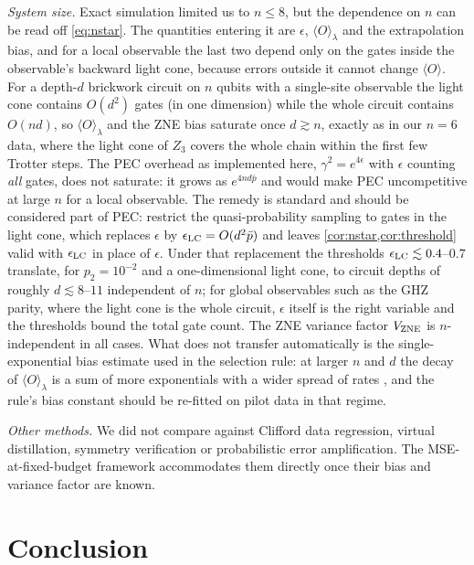 \documentclass[aps,pra,reprint,amsmath,amssymb,nofootinbib,superscriptaddress]{revtex4-2}
\theoremstyle{remark}
\newcommand{\eps}{\epsilon}
\begin{document}
\emph{System size.} Exact simulation limited us to $n\le8$, but the dependence on $n$ can be read off \cref{eq:nstar}. The quantities entering it are $\eps$, $\langle O\rangle_\lambda$ and the extrapolation bias, and for a local observable the last two depend only on the gates inside the observable's backward light cone, because errors outside it cannot change $\langle O\rangle$. For a depth-$d$ brickwork circuit on $n$ qubits with a single-site observable the light cone contains $O(d^2)$ gates (in one dimension) while the whole circuit contains $O(nd)$, so $\langle O\rangle_\lambda$ and the ZNE bias saturate once $d\gtrsim n$, exactly as in our $n=6$ data, where the light cone of $Z_3$ covers the whole chain within the first few Trotter steps. The PEC overhead as implemented here, $\gamma^2=e^{4\eps}$ with $\eps$ counting \emph{all} gates, does not saturate: it grows as $e^{4nd\bar p}$ and would make PEC uncompetitive at large $n$ for a local observable. The remedy is standard and should be considered part of PEC: restrict the quasi-probability sampling to gates in the light cone, which replaces $\eps$ by $\eps_{\rm LC}=O(d^2\bar p)$ and leaves \cref{cor:nstar,cor:threshold} valid with $\eps_{\rm LC}$ in place of $\eps$. Under that replacement the thresholds $\eps_{\rm LC}\lesssim0.4$--$0.7$ translate, for $p_2=10^{-2}$ and a one-dimensional light cone, to circuit depths of roughly $d\lesssim8$--$11$ independent of $n$; for global observables such as the GHZ parity, where the light cone is the whole circuit, $\eps$ itself is the right variable and the thresholds bound the total gate count. The ZNE variance factor $V_{\rm ZNE}$ is $n$-independent in all cases. What does not transfer automatically is the single-exponential bias estimate used in the selection rule: at larger $n$ and $d$ the decay of $\langle O\rangle_\lambda$ is a sum of more exponentials with a wider spread of rates \cite{cai2021}, and the rule's bias constant should be re-fitted on pilot data in that regime.

\emph{Other methods.} We did not compare against Clifford data regression, virtual distillation, symmetry verification or probabilistic error amplification. The MSE-at-fixed-budget framework accommodates them directly once their bias and variance factor are known.

\section{Conclusion}
\end{document}
